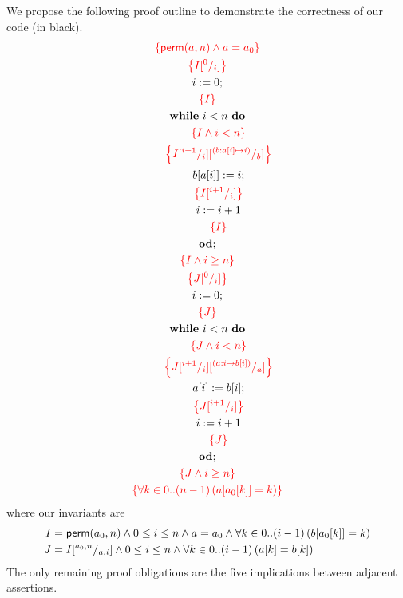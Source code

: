 \documentclass[a4paper,12pt,fleqn]{scrartcl}
\newcommand{\assn}[1]{{\color{red}\left\{#1\right\}}}
\newcommand{\remark}[1]{{\sffamily\color{blue}{#1}}}
\newcommand{\perm}{\mathsf{perm}}
\begin{document}
  We propose the following proof outline to demonstrate the correctness
  of our code (in black).
  \begin{gather*}
     \assn{\perm(a,n)\And a=a_0}\\
     \assn{I\subst 0i}\\
     i\Ass 0;\\
     \assn{I}\\
     \WHILE~i<n~\DO\\
     \qquad \assn{I\And i<n}\\
     \qquad \assn{I\subst{i+1}i\subst{(b:a[i]\mapsto i)}b}\\
     \qquad b[a[i]]\Ass i;\\
     \qquad \assn{I\subst{i+1}i}\\
     \qquad i\Ass i+1\\
     \qquad \assn{I}\\
     \OD;\\
     \assn{I\And i\geq n}\\
     \assn{J\subst 0i}\\
     i\Ass 0;\\
     \assn{J}\\
     \WHILE~i<n~\DO\\
     \qquad \assn{J\And i<n}\\
     \qquad \assn{J\subst{i+1}i\subst{(a:i\mapsto b[i])}a}\\
     \qquad a[i]\Ass b[i];\\
     \qquad \assn{J\subst{i+1}i}\\
     \qquad i\Ass i+1\\
     \qquad \assn{J}\\
     \OD;\\
     \assn{J\And i\geq n}\\
     \assn{\All{k\in 0..(n-1)}{a[a_0[k]]=k}}
  \end{gather*}
  where our invariants are
  \begin{align*}
    I &= \perm(a_0,n)\And 0\leq i \leq n \And a = a_0\And \All{k\in 0..(i-1)}{b[a_0[k]]=k}\\
    J &= I\subst{a_0,n}{a,i}\And 0\leq i \leq n\And \All{k\in 0..(i-1)}{a[k]=b[k]}
  \end{align*}
  \remark{Apart from the pre- and postcondition, all assertion as they occur in
  the code were derived using the Hoare logic rules for the enclosed
  constructs. Finding the two invariants is the only marginally creative
  activity here.} The only remaining proof obligations are the five
  implications between adjacent assertions.
  
\end{document}
